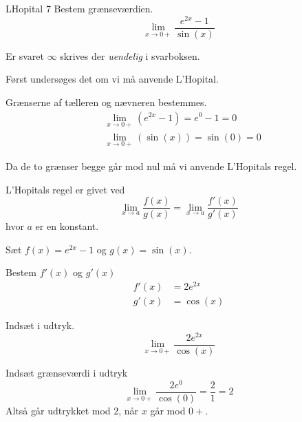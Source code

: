 \documentclass{article}
\begin{document}
\begin{exercise}{LHopital 7}
Bestem grænseværdien.
\[
\lim_{x \to 0+} \frac{e^{2x} - 1}{\sin(x)}
\] 

Er svaret $\infty$ skrives der \emph{uendelig} i svarboksen.


\hint
Først undersøges det om vi må anvende L'Hopital.

\hint
Grænserne af tælleren og nævneren bestemmes.
\begin{align*}
	&\lim_{x \to 0+} (e^{2x} - 1) = e^{0} - 1 = 0 \\
	&\lim_{x \to 0+} (\sin(x)) = \sin(0) = 0
\end{align*}

\hint
Da de to grænser begge går mod nul må vi  anvende L'Hopitals regel. 

\hint
L'Hopitals regel er givet ved
\[
\lim_{x \to a} \frac{f(x)}{g(x)} = \lim_{x \to a} \frac{f'(x)}{g'(x)} 
\]
hvor $a$  er en konstant.

\hint
Sæt $f(x) = e^{2x} - 1 $ og $g(x) = \sin(x)$. 

\hint
Bestem $f'(x)$ og $g'(x)$
\begin{align*}
	f'(x) &= 2 e^{2x} \\
	g'(x) &= \cos(x)
\end{align*}

\hint
Indsæt i udtryk.
\[
\lim_{x \to 0+} \frac{2 e^{2x}}{\cos(x)} 
\]

\hint
Indsæt grænseværdi i udtryk
\[
\lim_{x \to 0+} \frac{2 e^{0}}{\cos(0)}  =  \frac{2}{1} = 2 
\]
Altså går udtrykket mod $2$, når $x$ går mod $0+$. 

\end{exercise}
\end{document}
